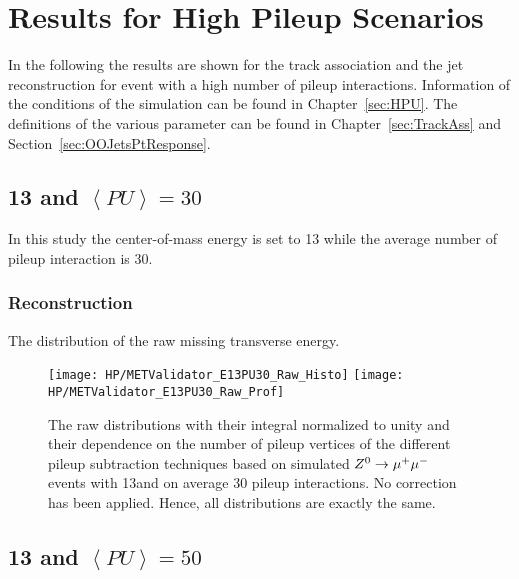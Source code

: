 \chapter{Results for High Pileup Scenarios \label{sec:HPUApp}}

In the following the results are shown for the track association and the jet reconstruction for event with a high number of pileup interactions. Information of the conditions of the simulation can be found in Chapter~\ref{sec:HPU}. The definitions of the various parameter can be found in Chapter~\ref{sec:TrackAss} and Section~\ref{sec:OOJetsPtResponse}.

\section{\texorpdfstring{13\TeV{}}{13 TeV} and \texorpdfstring{$\left<PU\right>=30$}{<PU>=30}}

In this study the center-of-mass energy is set to 13\TeV{} while the average number of pileup interaction is 30. 

\subsection{\texorpdfstring{\MET{}}{MET} Reconstruction  \label{sec:HPUAppE13PU30MC}}

The distribution of the raw missing transverse energy. 

\begin{figure}[h!t]
  \centering
  \texttt{[image: HP/METValidator\_E13PU30\_Raw\_Histo]}
  \texttt{[image: HP/METValidator\_E13PU30\_Raw\_Prof]}
  \caption[The raw \MET{} distributions and their dependence on the number of pileup vertices of different pileup subtraction techniques based on simulated  $\Zz\rightarrow\MM$ events with 13\TeV and $\left<PU\right>=30$]{The raw \MET{} distributions with their integral normalized to unity and their dependence on the number of pileup vertices of the different pileup subtraction techniques based on simulated  $\Zz\rightarrow\MM$ events with 13\TeV and on average 30 pileup interactions. No correction has been applied. Hence, all distributions are exactly the same.}
\end{figure}

\section{\texorpdfstring{13\TeV{}}{13 TeV} and \texorpdfstring{$\left<PU\right>=50$}{<PU>=50}}

